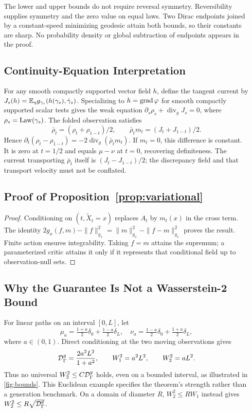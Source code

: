 The lower and upper bounds do not require reversal symmetry. Reversibility supplies symmetry and the zero value on equal laws. Two Dirac endpoints joined by a constant-speed minimizing geodesic attain both bounds, so their constants are sharp. No probability density or global subtraction of endpoints appears in the proof.

\subsection{Continuity-Equation Interpretation}
For any smooth compactly supported vector field $h$, define the tangent current by $J_s(h)=\mathbb E_\eta g_{\gamma_s}(h(\gamma_s),\dot\gamma_s)$. Specializing to $h=\operatorname{grad}\varphi$ for smooth compactly supported scalar tests gives the weak equation $\partial_s\rho_s+\operatorname{div}_gJ_s=0$, where $\rho_s=\operatorname{Law}(\gamma_s)$. The folded observation satisfies
\begin{equation}
\bar\rho_t=(\rho_t+\rho_{1-t})/2,\qquad
\bar\rho_t m_t=(J_t+J_{1-t})/2.
\end{equation}
Hence $\partial_t(\rho_t-\rho_{1-t})=-2\operatorname{div}_g(\bar\rho_tm_t)$. If $m_t=0$, this difference is constant. It is zero at $t=1/2$ and equals $\mu-\nu$ at $t=0$, recovering definiteness. The current transporting $\bar\rho_t$ itself is $(J_t-J_{1-t})/2$; the discrepancy field and that transport velocity must not be conflated.

\subsection{Proof of Proposition~\ref{prop:variational}}
\begin{proof}
Conditioning on $(t,\widetilde X_t=x)$ replaces $A_t$ by $m_t(x)$ in the cross term. The identity $2g_x(f,m)-\|f\|_{g_x}^2=\|m\|_{g_x}^2-\|f-m\|_{g_x}^2$ proves the result. Finite action ensures integrability. Taking $f=m$ attains the supremum; a parameterized critic attains it only if it represents that conditional field up to observation-null sets.
\end{proof}

\subsection{Why the Guarantee Is Not a Wasserstein-2 Bound}
For linear paths on an interval $[0,L]$, let
\begin{equation}
\mu_a=\tfrac{1+a}{2}\delta_0+\tfrac{1-a}{2}\delta_L,\quad
\nu_a=\tfrac{1-a}{2}\delta_0+\tfrac{1+a}{2}\delta_L,
\end{equation}
where $a\in(0,1)$. Direct conditioning at the two moving observations gives
\begin{equation}
\mathcal D_\Gamma^g=\frac{2a^2L^2}{1+a^2},\qquad
W_1^2=a^2L^2,\qquad W_2^2=aL^2.
\end{equation}
Thus no universal $W_2^2\leq C\mathcal D_\Gamma^g$ holds, even on a bounded interval, as illustrated in \cref{fig:bounds}. This Euclidean example specifies the theorem's strength rather than a generation benchmark. On a domain of diameter $R$, $W_2^2\leq R W_1$ instead gives $W_2^2\leq R\sqrt{\mathcal D_\Gamma^g}$.

